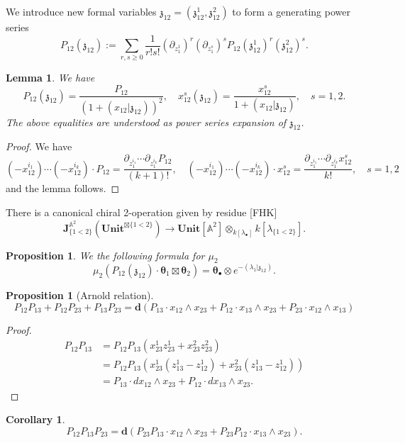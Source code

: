 \documentclass[11pt]{amsart}
\newtheorem{cor}[thm]{Corollary}
\newtheorem{lem}[thm]{Lemma}
\newtheorem{prop}[thm]{Proposition}
\theoremstyle{definition}
\theoremstyle{remark}
\numberwithin{equation}{section}
\begin{document}
We introduce new formal variables $\mathfrak{z}_{12}=(\mathfrak{z}_{12}^1,\mathfrak{z}^2_{12})$ to form a generating power series
$$
P_{12}(\mathfrak{z}_{12}):=\sum_{r,s\geq 0}\frac{1}{r!s!}(\partial_{z^1_1})^r(\partial_{z^s_1})^sP_{12}(\mathfrak{z}^1_{12})^r(\mathfrak{z}^2_{12})^s.
$$

\begin{lem}
  We have
  $$
  P_{12}(\mathfrak{z}_{12})=\frac{P_{12}}{\left(1+(x_{12}|\mathfrak{z}_{12})\right)^2},\quad x^s_{12}(\mathfrak{z}_{12})=\frac{x^s_{12}}{1+(x_{12}|\mathfrak{z}_{12})},\quad s=1,2.
  $$
  The above equalities are understood as power series expansion of $\mathfrak{z}_{12}$.
\end{lem}

\begin{proof}
  We have
  $$
  (-x^{i_1}_{12})\cdots (-x^{i_k}_{12})\cdot P_{12}=\frac{\partial_{z^{i_1}_1}\cdots \partial_{z^{i_k}_1}P_{12}}{  (k+1)!},\quad   (-x^{i_1}_{12})\cdots (-x^{i_k}_{12})\cdot x^s_{12}=\frac{\partial_{z^{i_1}_1}\cdots \partial_{z^{i_k}_1}x^s_{12}}{  k!},\quad s=1,2
  $$
  and the lemma follows.
\end{proof}

There is a canonical chiral 2-operation  given by residue [FHK]
$$
\mathbf{J}^{\mathbb{A}^2}_{\{1<2\}}(\mathbf{Unit}^{\boxtimes\{1<2\} })\rightarrow \mathbf{Unit}[\mathbb{A}^2]\otimes_{k[\lambda_{\bullet}]}k[\lambda_{\{1<2\}}].
$$

\begin{prop}
We the following formula for $\mu_2$
$$
\mu_2\left(P_{12}(\mathfrak{z}_{12})\cdot  \boldsymbol{\theta}_1\boxtimes  \boldsymbol{\theta}_2\right)=\boldsymbol{\theta}_{\bullet}\otimes e^{-(\lambda_1|\mathfrak{z}_{12})}.
$$
\end{prop}

\begin{prop}[Arnold relation]
  $$
  P_{12}P_{13}+P_{12}P_{23}+P_{13}P_{23}=\mathbf{d}\left(P_{13}\cdot x_{12}\wedge x_{23}+P_{12}\cdot x_{13}\wedge x_{23}+P_{23}\cdot x_{12}\wedge x_{13}\right)
  $$
\end{prop}
\begin{proof}

  \begin{align*}
   P_{12}P_{13}  &=P_{12}P_{13}(x^1_{23}z^1_{23}+x^2_{23}z^2_{23})  \\
     & =P_{12}P_{13}\left(x^1_{23}(z^1_{13}-z^1_{12})+x^2_{23}(z^1_{13}-z^1_{12})\right)\\
     &=P_{13}\cdot dx_{12}\wedge x_{23}+P_{12}\cdot dx_{13}\wedge x_{23}.
  \end{align*}
\end{proof}
\begin{cor}\label{RecursiveLemma}
  $$
  P_{12}P_{13}P_{23}=\mathbf{d}\left(P_{23}P_{13}\cdot x_{12}\wedge x_{23}+P_{23}P_{12}\cdot x_{13}\wedge x_{23}\right).
  $$
\end{cor}
\end{document}

